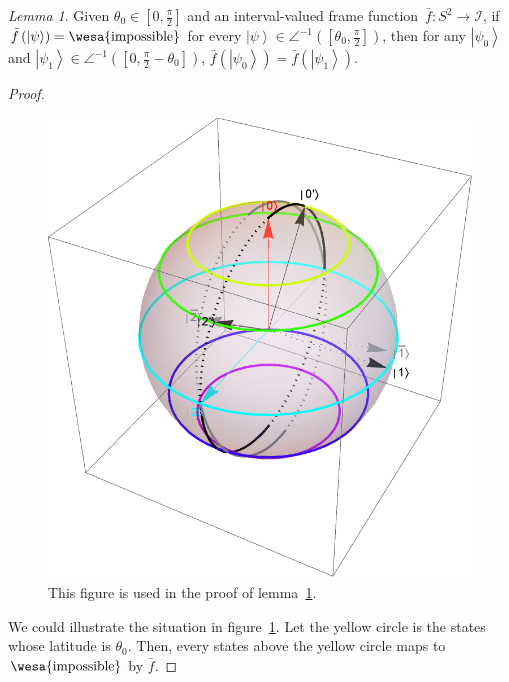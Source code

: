 \documentclass{article}
\theoremstyle{remark}
\newtheorem{lemma}{Lemma}
\newcommand{\imposs}{{\mbox{\wesa{impossible}}}}
\newcommand{\ket}[1]{{\left\vert{#1}\right\rangle}}
\begin{document}
\begin{lemma}\label{lemma:imposs-imply-same-value}Given $\theta_{0}\in\left[0,\frac{\pi}{2}\right]$
and an interval-valued frame function~$\bar{f}:S^{2}\rightarrow\mathscr{I}$,
if $\bar{f}\left(\ket{\psi}\right)=\imposs$ for every $\ket{\psi}\in\angle^{-1}\left(\left[\theta_{0},\frac{\pi}{2}\right]\right)$,
then for any $\ket{\psi_{0}}$ and $\ket{\psi_{1}}\in\angle^{-1}\left(\left[0,\frac{\pi}{2}-\theta_{0}\right]\right)$,
$\bar{f}\left(\ket{\psi_{0}}\right)=\bar{f}\left(\ket{\psi_{1}}\right)$.\end{lemma}
\begin{proof}
\begin{figure}
\begin{centering}
\includegraphics[scale=0.38]{real-frame-1} 
\par\end{centering}
\caption{\label{fig:three-dimensional-real-frame-1}This figure is used in
the proof of lemma~\ref{lemma:imposs-imply-same-value}.}
\end{figure}
We could illustrate the situation in figure~\ref{fig:three-dimensional-real-frame-1}.
Let the yellow circle is the states whose latitude is $\theta_{0}$.
Then, every states above the yellow circle maps to $\imposs$ by $\bar{f}$.

\end{proof}
\end{document}
